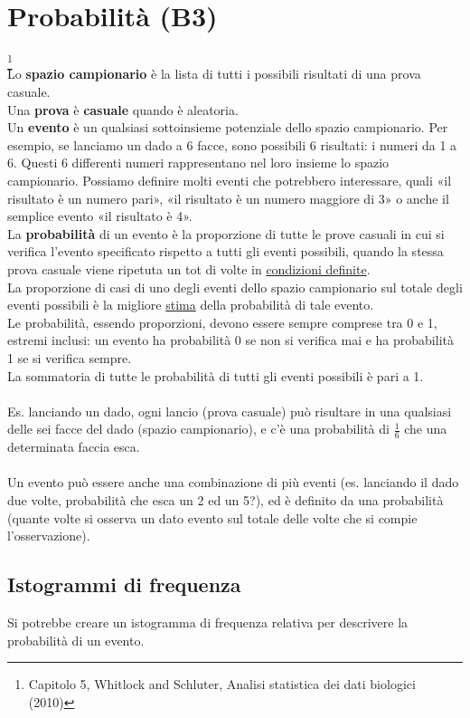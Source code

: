 \documentclass[drafts, 10pt]{book}
\begin{document}
\chapter{Probabilità (B3)}\footnote{Capitolo 5, Whitlock and Schluter, Analisi statistica dei dati biologici (2010)}
\\
Lo \textbf{spazio campionario} è la lista di tutti i possibili risultati di una prova casuale.
\\
Una \textbf{prova} è \textbf{casuale} quando è aleatoria.
\\
Un \textbf{evento} è un qualsiasi sottoinsieme potenziale dello spazio campionario. Per esempio, se lanciamo un dado a 6 facce, sono possibili 6 risultati: i numeri da 1 a 6. Questi 6 differenti numeri rappresentano nel loro insieme lo spazio campionario. Possiamo definire molti eventi che potrebbero interessare, quali «il risultato è un numero pari», «il risultato è un numero maggiore di 3» o anche il semplice evento «il risultato è 4». 
\\
La \textbf{probabilità} di un evento è la proporzione di tutte le prove casuali in cui si verifica l'evento specificato rispetto a tutti gli eventi possibili, quando la stessa prova casuale viene ripetuta un tot di volte in \underline{condizioni definite}.
\\
La proporzione di casi di uno degli eventi dello spazio campionario sul totale degli eventi possibili è la migliore \underline{stima} della probabilità di tale evento.
\\
Le probabilità, essendo proporzioni, devono essere sempre comprese tra 0 e 1, estremi inclusi: un evento ha probabilità 0 se non si verifica mai e ha probabilità 1 se si verifica sempre.
\\
La sommatoria di tutte le probabilità di tutti gli eventi possibili è pari a 1.
\\
\\
Es. lanciando un dado, ogni lancio (prova casuale) può risultare in una qualsiasi delle sei facce del dado (spazio campionario), e c’è una probabilità di $\frac{1}{6}$ che una determinata faccia esca.
\\
\\
Un evento può essere anche una combinazione di più eventi (es. lanciando il dado due volte, probabilità che esca un 2 ed un 5?), ed è definito da una probabilità (quante volte si osserva un dato evento sul totale delle volte che si compie l’osservazione).

\section{Istogrammi di frequenza}
Si potrebbe creare un istogramma di frequenza relativa per descrivere la probabilità di un evento.
\end{document}
